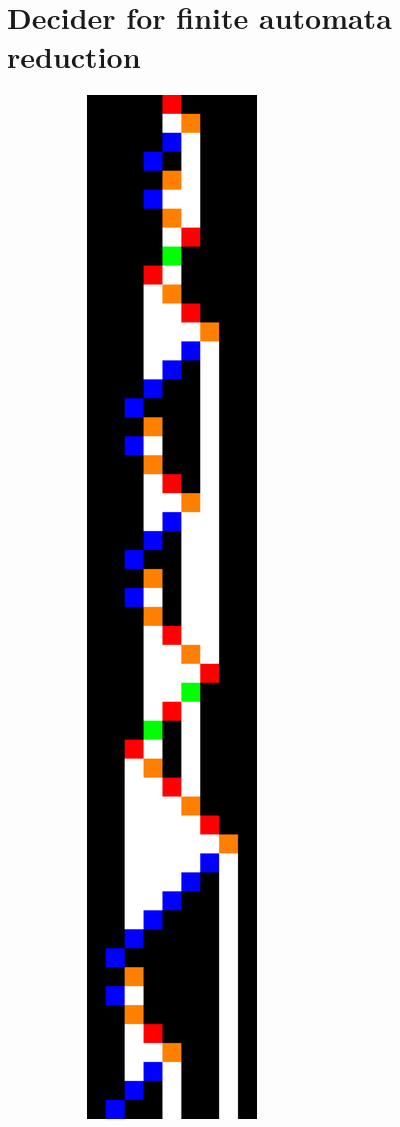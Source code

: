 \section{Decider for finite automata reduction}\label{sec:finite-automata-reduction}
\usetikzlibrary {automata, positioning}

\begin{figure}
  \centering
  \begin{subfigure}[m]{0.125\textwidth}
    \centering
    \includegraphics[width=\textwidth]{space-time-diagrams/finite-automata-reduction-counter4.pdf}

\end{subfigure}
\end{figure}
